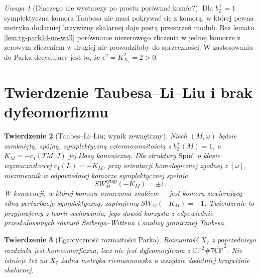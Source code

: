 \documentclass[11pt,a4paper]{report}
\numberwithin{equation}{section}
\theoremstyle{plain}
\newtheorem{twierdzenie}{Twierdzenie}[section]
\theoremstyle{definition}
\theoremstyle{remark}
\newtheorem{uwaga}[twierdzenie]{Uwaga}
\begin{document}
\begin{uwaga}[Dlaczego nie wystarczy po prostu porównać komór?]
Dla $b_2^+=1$ symplektyczna komora Taubesa nie musi
pokrywać się z komorą, w której pewna metryka dodatniej
krzywizny skalarnej daje pustą przestrzeń moduli.
Bez lematu \ref{lem:tg-park14-no-wall} porównanie
niezerowego zliczenia w jednej komorze z zerowym zliczeniem
w drugiej nie prowadziłoby do sprzeczności.
W zastosowaniu do Parka decydujące jest to, że
$c^2=K_{X_7}^2=2>0$.
\end{uwaga}

\section{Twierdzenie Taubesa--Li--Liu i brak dyfeomorfizmu}
\label{sec:tg-park14-exotic}

\begin{twierdzenie}[Taubes--Li--Liu; wynik zewnętrzny]
\label{thm:tg-park14-taubes}
Niech $(M,\omega)$ będzie zamkniętą, spójną,
symplektyczną czterorozmaitością z $b_2^+(M)=1$,
a $K_M=-c_1(TM,J)$ jej klasą kanoniczną.
Dla struktury $\mathrm{Spin}^c$ o klasie wyznacznikowej
$c_1(L)=-K_M$, przy orientacji homologicznej
zgodnej z $[\omega]$, niezmiennik w odpowiedniej
komorze symplektycznej spełnia
\[
SW_M^{\mathrm{symp}}(-K_M)=\pm1.
\]
W konwencji, w której komora oznaczona znakiem
$-$ jest komorą zawierającą silną perturbację
symplektyczną, zapisujemy $SW_M^-(-K_M)=\pm1$.
Twierdzenie to przyjmujemy z teorii cechowania;
jego dowód korzysta z odpowiednio przeskalowanych
równań Seiberga--Wittena i analizy granicznej Taubesa.
\end{twierdzenie}

\begin{twierdzenie}[Egzotyczność rozmaitości Parka]
\label{thm:tg-park14-exotic}
Rozmaitość $X_7$ z poprzedniego rozdziału jest
homeomorficzna, lecz nie jest dyfeomorficzna z
$\mathbb{CP}^{2}\#7\overline{\mathbb{CP}}^{\,2}$.
Nie istnieje też na $X_7$ żadna metryka riemannowska
o wszędzie dodatniej krzywiźnie skalarnej.
\end{twierdzenie}
\end{document}
